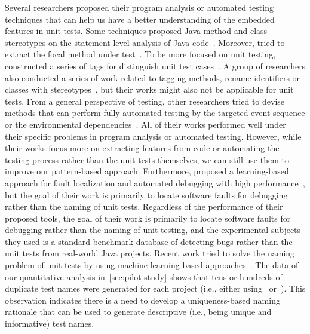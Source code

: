 Several researchers proposed their program analysis or automated testing techniques that can help us have a better understanding of the embedded features in unit tests. 
%
Some techniques proposed Java method and class stereotypes on the statement level analysis of Java code~\cite{moreno2012jstereocode,guarnera2018automatically}.
%
Moreover, \citeauthor{ghafari2015automatically} tried to extract the focal method under test~\cite{ghafari2015automatically}.
%
To be more focused on unit testing,~\citeauthor{li2018aiding} constructed a series of tags for distinguish unit test cases~\cite{li2018aiding}.
%
A group of researchers also conducted a series of work related to tagging methods, rename identifiers or classes with stereotypes~\cite{dragan2006reverse,dragan2010automatic,dragan2011emergent,sharif2013identifying,alhindawi2013improving,peruma2018empirical}, but their works might also not be applicable for unit tests.
%
From a general perspective of testing, other researchers tried to devise methods that can perform fully automated testing by the targeted event sequence or the environmental dependencies~\cite{jensen2013automated,arcuri2014automated}.
%
All of their works performed well under their specific problems in program analysis or automated testing. 
However, while their works focus more on extracting features from code or automating the testing process rather than the unit tests themselves, we can still use them to improve our pattern-based approach.
%
Furthermore, \citeauthor{li2019deepfl} proposed a learning-based approach for fault localization and automated debugging with high performance~\cite{li2019deepfl}, but the goal of their work is primarily to locate software faults for debugging rather than the naming of unit tests. 
%
Regardless of the performance of their proposed tools, the goal of their work is primarily to locate software faults for debugging rather than the naming of unit testing, and the experimental subjects they used is a standard benchmark database of detecting bugs rather than the unit tests from real-world Java projects.
%
Recent work tried to solve the naming problem of unit tests by using machine learning-based approaches~\cite{alon2018code2seq, alon2019code2vec}.
%
The data of our quantitative analysis in~\cref{sec:pilot-study} shows that tens or hundreds of duplicate test names were generated for each project (i.e., either using~\cite{alon2018code2seq} or~\cite{alon2019code2vec}).
%
This observation indicates there is a need to develop a uniqueness-based naming rationale that can be used to generate descriptive (i.e., being unique and informative) test names.


